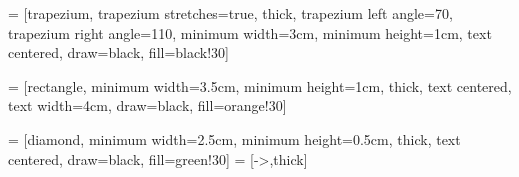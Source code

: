 = [trapezium,
trapezium stretches=true, %
thick,
trapezium left angle=70,
trapezium right angle=110,
minimum width=3cm,
minimum height=1cm, text centered,
draw=black, fill=black!30]

 = [rectangle,
minimum width=3.5cm,
minimum height=1cm,
thick,
text centered,
text width=4cm,
draw=black,
fill=orange!30]

 = [diamond,
minimum width=2.5cm,
minimum height=0.5cm,
thick,
text centered,
draw=black,
fill=green!30]
 = [->,thick]


\usepackage{sankey}
\usepackage{pifont}
\newcommand{\cmark}{\ding{51}}%
\newcommand{\xmark}{\ding{55}}%